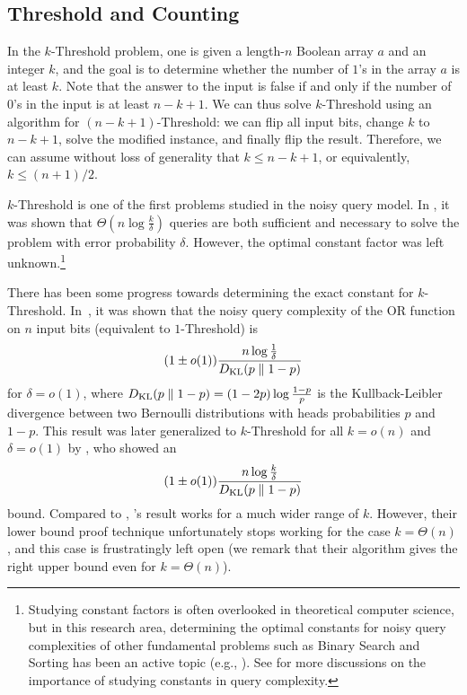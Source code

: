 \subsection{Threshold and Counting}

In the $k$-Threshold problem, one is given a length-$n$ Boolean array $a$ and an integer $k$, and the goal is to determine whether the number of $1$'s in the array $a$ is at least $k$. Note that the answer to the input is false if and only if the number of $0$'s in the input is at least $n - k + 1$. We can thus solve $k$-Threshold using an algorithm for $(n-k+1)$-Threshold: we can flip all input bits, change $k$ to $n - k + 1$, solve the modified instance, and finally flip the result. Therefore, we can assume without loss of generality that $k \le n - k +  1$, or equivalently, $k \le (n + 1) / 2$.

$k$-Threshold is one of the first problems studied in the noisy query model. In \cite{feige1994computing}, it was shown that $\Theta\left(n \log \frac k\delta\right)$ queries are both sufficient and necessary to solve the problem with error probability $\delta$. However, the optimal constant factor was left unknown.\footnote{Studying constant factors is often overlooked in theoretical computer science, but in this research area, determining the optimal constants for noisy query complexities of other fundamental problems such as Binary Search and Sorting has been an active topic (e.g., \cite{burnashev1974interval, ben2008bayesian,dereniowski2021noisy, gu2023optimal}). See \cite{DBLP:conf/icalp/Gretta024} for more discussions on the importance of studying constants in query complexity. }

There has been some progress towards determining the exact constant for $k$-Threshold. In~\cite{zhu2023noisy}, it was shown that the noisy query complexity of the $\mathrm{OR}$ function on $n$ input bits (equivalent to $1$-Threshold) is
\[
(1 \pm o(1)) \frac{n \log \frac{1}{\delta}}{D_{\operatorname{\mathrm{KL}}}(p \parallel 1-p)}
\]
for $\delta=o(1)$,  where $D_{\operatorname{\mathrm{KL}}}(p \parallel 1-p)=(1-2p)\log \frac{1-p}p$ is the Kullback-Leibler divergence between two Bernoulli distributions with heads probabilities $p$ and $1 - p$.
This result was later generalized to $k$-Threshold for all $k = o(n)$ and $\delta = o(1)$ by \cite{wang2024noisy}, who showed an
\[
(1 \pm o(1)) \frac{n \log \frac{k}{\delta}}{D_{\operatorname{\mathrm{KL}}}(p \parallel 1-p)}
\]
bound. Compared to \cite{zhu2023noisy}, \cite{wang2024noisy}'s result works for a much wider range of $k$. However, their lower bound proof technique unfortunately stops working for the case $k = \Theta(n)$, and this case is frustratingly left open (we remark that their algorithm gives the right upper bound even for $k=\Theta(n)$).

